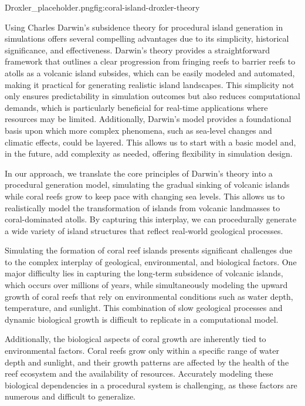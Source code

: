 \begin{Itemize}
{    }{Droxler_placeholder.png}{}{fig:coral-island-droxler-theory}
\end{Itemize}


Using Charles Darwin's subsidence theory for procedural island generation in simulations offers several compelling advantages due to its simplicity, historical significance, and effectiveness. Darwin's theory provides a straightforward framework that outlines a clear progression from fringing reefs to barrier reefs to atolls as a volcanic island subsides, which can be easily modeled and automated, making it practical for generating realistic island landscapes. This simplicity not only ensures predictability in simulation outcomes but also reduces computational demands, which is particularly beneficial for real-time applications where resources may be limited.
Additionally, Darwin's model provides a foundational basis upon which more complex phenomena, such as sea-level changes and climatic effects, could be layered. This allows us to start with a basic model and, in the future, add complexity as needed, offering flexibility in simulation design. 

In our approach, we translate the core principles of Darwin's theory into a procedural generation model, simulating the gradual sinking of volcanic islands while coral reefs grow to keep pace with changing sea levels. This allows us to realistically model the transformation of islands from volcanic landmasses to coral-dominated atolls. By capturing this interplay, we can procedurally generate a wide variety of island structures that reflect real-world geological processes.

%

Simulating the formation of coral reef islands presents significant challenges due to the complex interplay of geological, environmental, and biological factors. One major difficulty lies in capturing the long-term subsidence of volcanic islands, which occurs over millions of years, while simultaneously modeling the upward growth of coral reefs that rely on environmental conditions such as water depth, temperature, and sunlight. This combination of slow geological processes and dynamic biological growth is difficult to replicate in a computational model.

Additionally, the biological aspects of coral growth are inherently tied to environmental factors. Coral reefs grow only within a specific range of water depth and sunlight, and their growth patterns are affected by the health of the reef ecosystem and the availability of resources. Accurately modeling these biological dependencies in a procedural system is challenging, as these factors are numerous and difficult to generalize.

